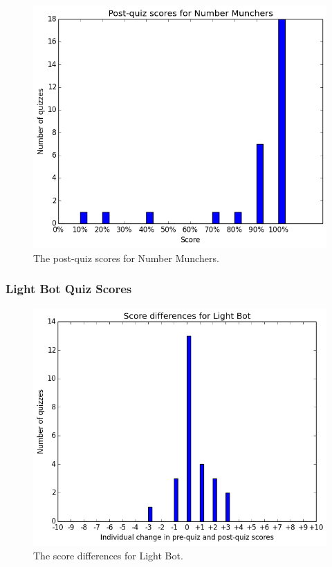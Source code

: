 			\begin{figure}[h!] 
			\centering 
			\includegraphics[height=0.33\textheight]{munchers_post.png} 
			\caption{The post-quiz scores for Number Munchers.}
			\end{figure}


\cleardoublepage

		\subsubsection{Light Bot Quiz Scores}

			\begin{figure}[h!] 
			\centering 
			\includegraphics[height=0.33\textheight]{lightbot_results.png} 
			\caption{The score differences for Light Bot.}
			\end{figure}

